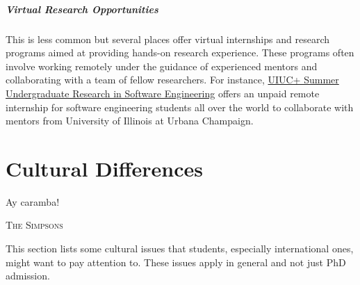 \documentclass[oneside,11pt,dvipsnames]{book}
\begin{document}
\paragraph{Virtual Research Opportunities} This is less common but several places offer virtual internships and research programs aimed at providing hands-on research experience. These programs often involve working remotely under the guidance of experienced mentors and collaborating with a team of fellow researchers. For instance, \href{https://docs.google.com/forms/d/1btIwt4HwjyKMOUk-EMy3rbkfWzFxv2lNrMm_zkd0pA4/viewform?edit_requested=true}{UIUC+ Summer Undergraduate Research in Software Engineering}  offers an unpaid remote internship for software engineering students all over the world to collaborate with mentors from University of Illinois at Urbana Champaign.




\chapter{Cultural Differences}\label{sec:cultural}

\epigraph{\vspace{-0.2in} Ay caramba!}{\textsc{The Simpsons}}


This section lists some cultural issues that students, especially international ones, might want to pay attention to. These issues apply in general and not just PhD admission.

\end{document}
